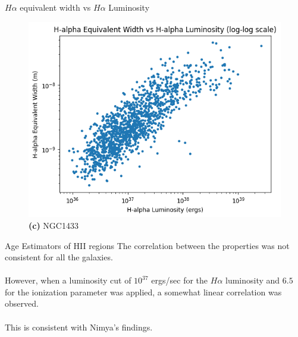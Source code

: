 \documentclass{beamer}
\begin{document}
\begin{frame}{$H\alpha$ equivalent width vs $H\alpha$ Luminosity}
    \begin{figure}[H]
        \centering
        \includegraphics[scale = 0.25]{image32.png}
        \caption*{\textbf{(c)} NGC1433}
        \label{fig:image7}
    \end{figure}
\end{frame}



\begin{frame}{Age Estimators of HII regions}
    The correlation between the properties was not consistent for all the galaxies. 
    \\~\\
    However, when a luminosity cut of $10^{37}$ ergs/sec for the $H\alpha$ luminosity and $6.5$ for the ionization parameter was applied, a somewhat linear correlation was observed. 
    \\~\\
    This is consistent with Nimya's findings.
\end{frame}
\end{document}
